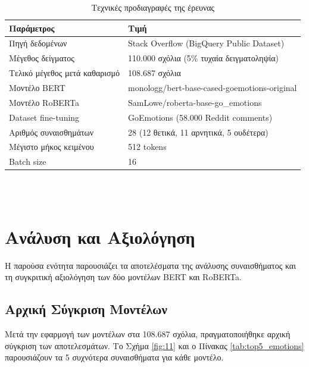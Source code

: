 \documentclass[a4paper,11pt,oneside,openany]{ioniothesis}
\begin{document}
\begin{table}[H]
\centering
\caption{Τεχνικές προδιαγραφές της έρευνας}
\label{tab:technical_specs}
\begin{tabular}{@{}ll@{}}
\toprule
\textbf{Παράμετρος} & \textbf{Τιμή} \\
\midrule
Πηγή δεδομένων & Stack Overflow (BigQuery Public Dataset) \\
Μέγεθος δείγματος & 110.000 σχόλια (5\% τυχαία δειγματοληψία) \\
Τελικό μέγεθος μετά καθαρισμό & 108.687 σχόλια \\
Μοντέλο BERT & monologg/bert-base-cased-goemotions-original \\
Μοντέλο RoBERTa & SamLowe/roberta-base-go\_emotions \\
Dataset fine-tuning & GoEmotions (58.000 Reddit comments) \\
Αριθμός συναισθημάτων & 28 (12 θετικά, 11 αρνητικά, 5 ουδέτερα) \\
Μέγιστο μήκος κειμένου & 512 tokens \\
Batch size & 16 \\
\bottomrule
\end{tabular}
\end{table}




\\
\



\section{Ανάλυση και Αξιολόγηση}
\label{sec:Ανάλυση και Αξιολόγηση}

Η παρούσα ενότητα παρουσιάζει τα αποτελέσματα της ανάλυσης συναισθήματος και τη συγκριτική αξιολόγηση των δύο μοντέλων BERT και RoBERTa.

\subsection{Αρχική Σύγκριση Μοντέλων}
\label{sec:Αρχική Σύγκριση Μοντέλων}

Μετά την εφαρμογή των μοντέλων στα 108.687 σχόλια, πραγματοποιήθηκε αρχική σύγκριση των αποτελεσμάτων. Το Σχήμα \ref{fig:11} και ο Πίνακας \ref{tab:top5_emotions} παρουσιάζουν τα 5 συχνότερα συναισθήματα για κάθε μοντέλο.
\end{document}
